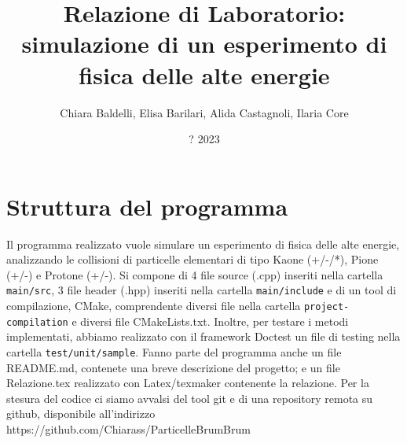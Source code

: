 \documentclass{article}
\title{\textbf{Relazione di Laboratorio: simulazione di un esperimento di fisica delle alte energie}}
\author{ Chiara Baldelli, Elisa Barilari, Alida Castagnoli, Ilaria Core}
\date{? 2023}
\begin{document}
\maketitle
\tableofcontents
\newpage

\section{Struttura del programma} Il programma realizzato vuole simulare un esperimento di fisica delle alte energie, analizzando le collisioni di particelle elementari di tipo Kaone (+/-/*), Pione (+/-) e Protone (+/-). Si compone di 4 file source (.cpp) inseriti nella cartella \verb|main/src|, 3 file header (.hpp) inseriti nella cartella \verb|main/include| e di un tool di compilazione, CMake, comprendente diversi file nella cartella \verb|project-compilation| e diversi file CMakeLists.txt. Inoltre, per testare i metodi implementati, abbiamo realizzato con il framework Doctest un file di testing nella cartella \verb|test/unit/sample|. Fanno parte del programma anche un file README.md, contenete una breve descrizione del progetto; e un file Relazione.tex realizzato con Latex/texmaker contenente la relazione. Per la stesura del codice ci siamo avvalsi del tool git e di una repository remota su github, disponibile all'indirizzo https://github.com/Chiarass/ParticelleBrumBrum
\end{document}
